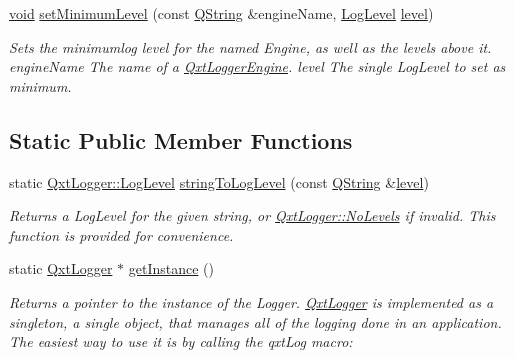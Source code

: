 \begin{DoxyCompactItemize}
\hyperlink{group___u_a_v_objects_plugin_ga444cf2ff3f0ecbe028adce838d373f5c}{void} \hyperlink{class_qxt_logger_a4143c3d70add1fd8eb345b16a7a75816}{set\-Minimum\-Level} (const \hyperlink{group___u_a_v_objects_plugin_gab9d252f49c333c94a72f97ce3105a32d}{Q\-String} \&engine\-Name, \hyperlink{class_qxt_logger_ac2071072628aa786466124cc32a324e7}{Log\-Level} \hyperlink{glext_8h_abc60a79088789bd61297bf5f9ff500d1}{level})
\begin{DoxyCompactList}\small\item\em Sets the minimumlog level for the named Engine, as well as the levels above it. {\itshape engine\-Name} The name of a \hyperlink{class_qxt_logger_engine}{Qxt\-Logger\-Engine}. {\itshape level} The single Log\-Level to set as minimum. \end{DoxyCompactList}\end{DoxyCompactItemize}
\subsection*{Static Public Member Functions}
\begin{DoxyCompactItemize}
\item 
static \hyperlink{class_qxt_logger_ac2071072628aa786466124cc32a324e7}{Qxt\-Logger\-::\-Log\-Level} \hyperlink{class_qxt_logger_a041933ae8f3280b4ae3b87353360c576}{string\-To\-Log\-Level} (const \hyperlink{group___u_a_v_objects_plugin_gab9d252f49c333c94a72f97ce3105a32d}{Q\-String} \&\hyperlink{glext_8h_abc60a79088789bd61297bf5f9ff500d1}{level})
\begin{DoxyCompactList}\small\item\em Returns a Log\-Level for the given string, or \hyperlink{class_qxt_logger_ac2071072628aa786466124cc32a324e7ac3f7ad50aaf29333c33202a15c9e7ae0}{Qxt\-Logger\-::\-No\-Levels} if invalid. This function is provided for convenience. \end{DoxyCompactList}\item 
static \hyperlink{class_qxt_logger}{Qxt\-Logger} $\ast$ \hyperlink{class_qxt_logger_a6103bf4f639e41e7fb522c110991fa22}{get\-Instance} ()
\begin{DoxyCompactList}\small\item\em Returns a pointer to the instance of the Logger. \hyperlink{class_qxt_logger}{Qxt\-Logger} is implemented as a singleton, a single object, that manages all of the logging done in an application. The easiest way to use it is by calling the qxt\-Log macro\-: \end{DoxyCompactList}\end{DoxyCompactItemize}


